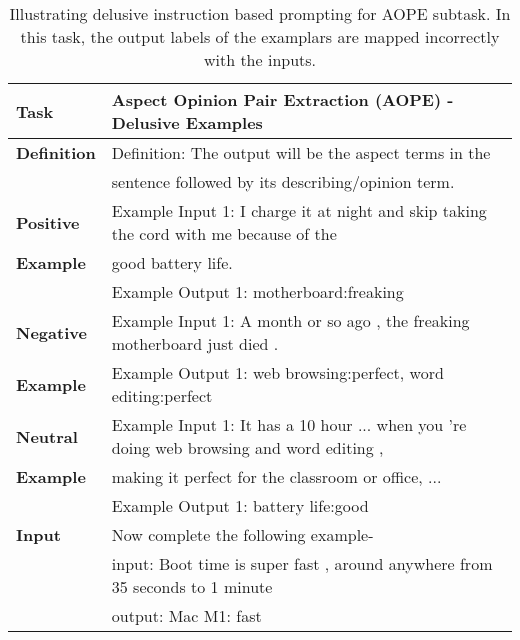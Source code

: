 \documentclass[11pt]{article}
\begin{document}
\begin{table*}[]
\resizebox{\linewidth}{!}
{
\begin{tabular}{ll}
\hline
\textbf{Task} & Aspect Opinion Pair Extraction (AOPE) - Delusive Examples \\ 
\hline                                                  
\textbf{Definition} & Definition: The output will be the aspect terms in the \\
& sentence followed by its describing/opinion term.\\ 
\hline                                          
\textbf{Positive}   & Example Input 1: I charge it at night and skip taking the cord with me because of the \\ 
\textbf{Example}    &  good battery life.       \\
\textbf{}           & Example Output 1: motherboard:freaking   \\
\hline                             
\textbf{Negative}   & Example Input 1: A month or so ago , the freaking motherboard just died . \\
\textbf{Example}    & Example Output 1: web browsing:perfect, word editing:perfect \\
\hline  
\textbf{Neutral}    & Example Input 1: It has a 10 hour ... when you 're doing web browsing and word editing , \\
\textbf{Example}    & making it perfect for the classroom or office, ...          \\
\textbf{}           & Example Output 1: battery life:good          \\                 
\hline 
\textbf{Input}      & Now complete the following example-                                \\
\textbf{}           & input: Boot time is super fast , around anywhere from 35 seconds to 1 minute \\
                    & output: Mac M1: fast\\ \hline
\end{tabular}
}
\caption{
     Illustrating delusive instruction based prompting for AOPE subtask. In this task, the output labels of the examplars are mapped incorrectly with the inputs.}
\label{tab:absa6_aope}
\end{table*} 
\end{document}
